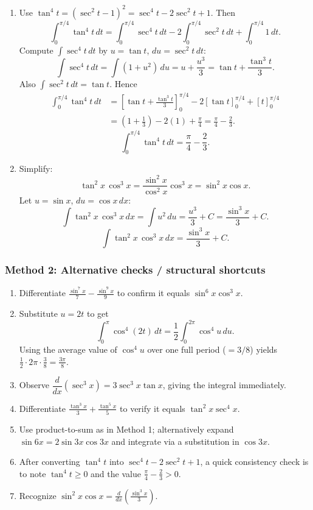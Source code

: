 \documentclass[12pt]{article}
\begin{document}
\begin{enumerate}[label=(\alph*)]
\item Use \(\tan^{4}t=(\sec^{2}t-1)^{2}=\sec^{4}t-2\sec^{2}t+1\). Then
\[
\int_{0}^{\pi/4}\tan^{4}t\,dt
=\int_{0}^{\pi/4}\sec^{4}t\,dt-2\int_{0}^{\pi/4}\sec^{2}t\,dt+\int_{0}^{\pi/4}1\,dt.
\]
Compute \(\int \sec^{4}t\,dt\) by \(u=\tan t\), \(du=\sec^{2}t\,dt\):
\[
\int \sec^{4}t\,dt=\int (1+u^{2})\,du=u+\frac{u^{3}}{3}=\tan t+\frac{\tan^{3}t}{3}.
\]
Also \(\int \sec^{2}t\,dt=\tan t\). Hence
\begin{align*}
\int_{0}^{\pi/4}\tan^{4}t\,dt
&=\left[\tan t+\frac{\tan^{3}t}{3}\right]_{0}^{\pi/4}
-2\left[\tan t\right]_{0}^{\pi/4}
+\left[t\right]_{0}^{\pi/4}\\
&=\left(1+\frac{1}{3}\right)-2(1)+\frac{\pi}{4}
=\frac{\pi}{4}-\frac{2}{3}.
\end{align*}
\[
\boxed{\int_{0}^{\pi/4}\tan^{4}t\,dt=\frac{\pi}{4}-\frac{2}{3}.}
\]

\item Simplify:
\[
\tan^{2}x\,\cos^{3}x=\frac{\sin^{2}x}{\cos^{2}x}\cos^{3}x=\sin^{2}x\cos x.
\]
Let \(u=\sin x\), \(du=\cos x\,dx\):
\[
\int \tan^{2}x\,\cos^{3}x\,dx=\int u^{2}\,du=\frac{u^{3}}{3}+C=\frac{\sin^{3}x}{3}+C.
\]
\[
\boxed{\int \tan^{2}x\,\cos^{3}x\,dx=\frac{\sin^{3}x}{3}+C.}
\]
\end{enumerate}

\subsubsection*{Method 2: Alternative checks / structural shortcuts}

\begin{enumerate}[label=(\alph*)]
\item Differentiate \(\frac{\sin^{7}x}{7}-\frac{\sin^{9}x}{9}\) to confirm it equals \(\sin^{6}x\cos^{3}x\).

\item Substitute \(u=2t\) to get
\[
\int_{0}^{\pi}\cos^{4}(2t)\,dt=\frac{1}{2}\int_{0}^{2\pi}\cos^{4}u\,du.
\]
Using the average value of \(\cos^{4}u\) over one full period (\(=3/8\)) yields \(\frac{1}{2}\cdot 2\pi\cdot \frac{3}{8}=\frac{3\pi}{8}\).

\item Observe \(\dfrac{d}{dx}(\sec^{3}x)=3\sec^{3}x\tan x\), giving the integral immediately.

\item Differentiate \(\frac{\tan^{3}x}{3}+\frac{\tan^{5}x}{5}\) to verify it equals \(\tan^{2}x\sec^{4}x\).

\item Use product-to-sum as in Method 1; alternatively expand \(\sin 6x=2\sin 3x\cos 3x\) and integrate via a substitution in \(\cos 3x\).

\item After converting \(\tan^{4}t\) into \(\sec^{4}t-2\sec^{2}t+1\), a quick consistency check is to note \(\tan^{4}t\ge 0\) and the value \(\frac{\pi}{4}-\frac{2}{3}>0\).

\item Recognize \(\sin^{2}x\cos x=\frac{d}{dx}\left(\frac{\sin^{3}x}{3}\right)\).
\end{enumerate}
\end{document}
